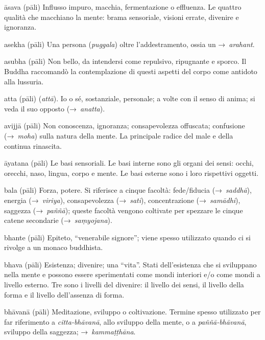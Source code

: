 \begin{glossarydescription}
\item[āsava] (pāli) Influsso impuro, macchia, fermentazione o effluenza. Le
  quattro qualità che macchiano la mente: brama sensoriale, visioni errate,
  divenire e ignoranza.

\item[asekha] (pāli) Una persona (\emph{puggala}) oltre l'addestramento, ossia
  un →~\emph{arahant}.

\item[asubha] (pāli) Non bello, da intendersi come repulsivo, ripugnante e
  sporco. Il Buddha raccomandò la contemplazione di questi aspetti del corpo
  come antidoto alla lussuria.

\item[atta] (pāli) (\emph{attā}). Io o sé, sostanziale, personale; a volte con
  il senso di anima; si veda il suo opposto (→~\emph{anatta}).

\item[avijjā] (pāli) Non conoscenza, ignoranza; consapevolezza offuscata;
  confusione (→~\emph{moha}) sulla natura della mente. La principale radice del
  male e della continua rinascita.

\item[āyatana] (pāli) Le basi sensoriali. Le basi interne sono gli organi dei
  sensi: occhi, orecchi, naso, lingua, corpo e mente. Le basi esterne sono i
  loro rispettivi oggetti.


\item[bala] (pāli) Forza, potere. Si riferisce a cinque facoltà: fede/fiducia
  (→~\emph{saddhā}), energia (→~\emph{viriya}), consapevolezza (→~\emph{sati}),
  concentrazione (→~\emph{samādhi}), saggezza (→~\emph{paññā}); queste facoltà
  vengono coltivate per spezzare le cinque catene secondarie
  (→~\emph{saṃyojana}).

\item[bhante] (pāli) Epiteto, ``venerabile signore''; viene spesso utilizzato
  quando ci si rivolge a un monaco buddhista.

\item[bhava] (pāli) Esistenza; divenire; una ``vita''. Stati dell'esistenza che
  si sviluppano nella mente e possono essere sperimentati come mondi interiori
  e/o come mondi a livello esterno. Tre sono i livelli del divenire: il livello
  dei sensi, il livello della forma e il livello dell'assenza di forma.

\item[bhāvanā] (pāli) Meditazione, sviluppo o coltivazione. Termine spesso
  utilizzato per far riferimento a \emph{citta-bhāvanā}, allo sviluppo della
  mente, o a \emph{paññā-bhāvanā}, sviluppo della saggezza;
  →~\emph{kammaṭṭhāna}.


\end{glossarydescription}
